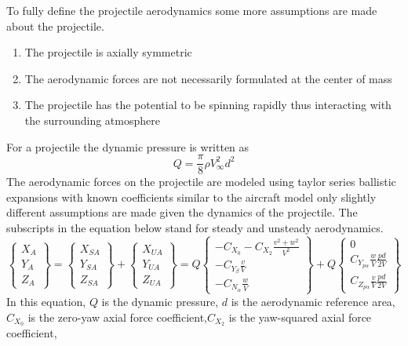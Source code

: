 \documentclass{article}
\begin{document}
To fully define the projectile aerodynamics some more assumptions are
made about the projectile.
\begin{enumerate}
\item The projectile is axially symmetric
\item The aerodynamic forces are not necessarily formulated at the center
  of mass
\item The projectile has the potential to be spinning rapidly thus
  interacting with the surrounding atmosphere
\end{enumerate}
For a projectile the dynamic pressure is written as
\begin{equation}
Q = \frac{\pi}{8}\rho V_{\infty}^2d^2 
\end{equation}
The aerodynamic forces on the projectile are modeled using taylor series
ballistic expansions with known coefficients similar to the aircraft
model only slightly different assumptions are made given the dynamics
of the projectile. The subscripts in the equation below stand for
steady and unsteady aerodynamics.
\begin{equation}\label{e:aeroF}
\begin{Bmatrix} X_A \\ Y_A\\ Z_A \end{Bmatrix} = \begin{Bmatrix}
  X_{SA} \\ Y_{SA}\\ Z_{SA} \end{Bmatrix} + \begin{Bmatrix}
  X_{UA} \\ Y_{UA}\\ Z_{UA} \end{Bmatrix} = 
Q \begin{Bmatrix} -C_{X_0} - C_{X_2}\frac{v^2+w^2}{V^2}\\
-C_{Y_\beta}\frac{v}{V}\\
-C_{N_\alpha}\frac{w}{V}
\end{Bmatrix} + Q \begin{Bmatrix} 0
  \\ C_{Y_{p\alpha}}\frac{w}{V}\frac{pd}{2V} \\ C_{Z_{p\alpha}}\frac{v}{V}\frac{pd}{2V}\end{Bmatrix}
\end{equation}
In this equation, $Q$ is the dynamic pressure, $d$ is the aerodynamic
reference area, $C_{X_0}$ is the zero-yaw axial force
coefficient,$C_{X_2}$ is the yaw-squared axial force coefficient,
\end{document}
